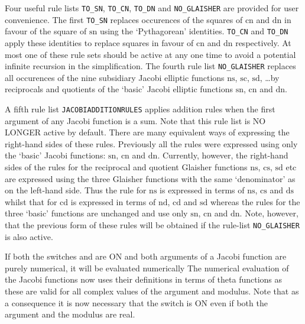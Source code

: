 \hypertarget{reserved:TO_SN}{}
\hypertarget{reserved:TO_CN}{}
\hypertarget{reserved:TO_DN}{}
\hypertarget{reserved:NO_GLAISHER}{}
\hypertarget{reserved:JacobiAdditionRules}{}
Four useful rule lists \texttt{TO\_SN}, \texttt{TO\_CN}, \texttt{TO\_DN} and
\texttt{NO\_GLAISHER} are provided for user convenience. The first
\texttt{TO\_SN} replaces occurences of the squares of $\mathrm{cn}$ and
$\mathrm{dn}$ in favour of the square of $\mathrm{sn}$ using the
`Pythagorean' identities. \texttt{TO\_CN} and \texttt{TO\_DN} apply these
identities to replace squares in favour of $\mathrm{cn}$ and $\mathrm{dn}$
respectively. At most one of these rule sets should be active at any one time
to avoid a potential infinite recursion in the simplification.
The fourth rule list \texttt{NO\_GLAISHER} replaces all occurences of the
nine subsidiary Jacobi elliptic functions $\mathrm{ns}$, $\mathrm{sc}$,
$\mathrm{sd}$, \ldots by reciprocals and quotients of the `basic' Jacobi
elliptic functions $\mathrm{sn}$, $\mathrm{cn}$ and $\mathrm{dn}$.

A fifth rule list \texttt{JACOBIADDITIONRULES} applies addition rules when the
first argument of any Jacobi function is a sum.  Note that this rule list is NO
LONGER active by default. There are many equivalent ways of expressing the
right-hand sides of these rules. Previously all the rules were expressed using
only the `basic' Jacobi functions: $\mathrm{sn}$, $\mathrm{cn}$ and
$\mathrm{dn}$. Currently, however, the right-hand sides of the rules for the
reciprocal and quotient Glaisher functions $\mathrm{ns}$, $\mathrm{cs}$,
$\mathrm{sd}$ etc are expressed using the three Glaisher functions with
the same `denominator' as on the left-hand side. Thus the rule for $\mathrm{ns}$
is expressed in terms of $\mathrm{ns}$, $\mathrm{cs}$ and $\mathrm{ds}$
whilst that for $\mathrm{cd}$ is expressed in terms of $\mathrm{nd}$,
$\mathrm{cd}$ and $\mathrm{sd}$ whereas the rules for the three `basic'
functions are unchanged and use only $\mathrm{sn}$, $\mathrm{cn}$ and
$\mathrm{dn}$.  Note, however, that the previous form of these rules will be
obtained if the rule-list \texttt{NO\_GLAISHER} is also active. 

If both the switches  and  are ON and both arguments
of a Jacobi function are purely numerical, it will be evaluated numerically 
The numerical evaluation of the Jacobi functions now uses their definitions
in terms of theta functions as these are valid for all complex values of the
argument and modulus.  Note that as a consequence it is now necessary that the
switch  is ON even if both the argument and the modulus are real.

